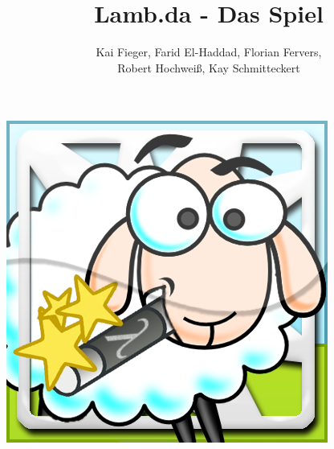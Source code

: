 \documentclass[parskip=full]{scrartcl}
\title{Lamb.da - Das Spiel}
\author{ 	
Kai Fieger, Farid El-Haddad,  Florian Fervers,
\\
Robert Hochweiß,  Kay Schmitteckert
}
\begin{document}
\maketitle
	\begin{center}
	\includegraphics[width=300pt]{../GUI-Entwurf/icon.png}
	\end{center}
	
\newpage
\tableofcontents
\newpage

\newpage











\end{document}

